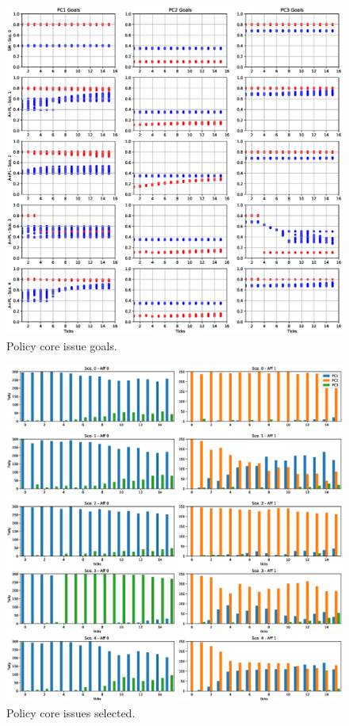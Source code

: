 \documentclass[12pt]{article}
\begin{document}
\begin{figure}
\centering
\includegraphics[width = 0.95\linewidth, angle = 0]{figures/PE_PL_PCGoals_+PL}
\caption{Policy core issue goals.}
\label{fig:PE_PL_PCGoals}
\end{figure}

\begin{figure}
\centering
\includegraphics[width = 0.95\linewidth, angle = 0]{figures/PE_PL_PCSelected_+PL}
\caption{Policy core issues selected.}
\label{fig:PE_PL_PCSelected}
\end{figure}
\end{document}
